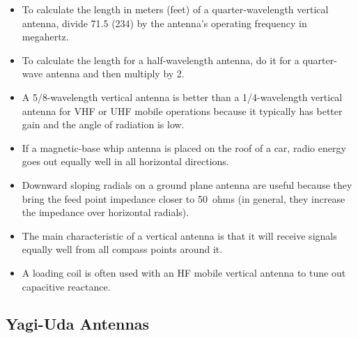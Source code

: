 \documentclass[letterpaper,12pt]{scrartcl}
\begin{document}
\begin{itemize}
\item To calculate the length in meters (feet) of a quarter-wavelength vertical antenna,
divide 71.5 (234) by the antenna's operating frequency in megahertz.
\item To calculate the length for a half-wavelength antenna, do it for a quarter-wave antenna and then multiply by 2.
\item A 5/8-wavelength vertical antenna is better than a 1/4-wavelength vertical antenna for VHF or UHF mobile operations
because it typically has better gain and the angle of radiation is low.
\item If a magnetic-base whip antenna is placed on the roof of a car, radio energy goes out equally well in all horizontal directions.
\item Downward sloping radials on a ground plane antenna are useful because they bring the feed point impedance closer to 50~ohms
(in general, they increase the impedance over horizontal radials).
\item The main characteristic of a vertical antenna is that it will receive signals equally well from all compass points around it.
\item A loading coil is often used with an HF mobile vertical antenna to tune out capacitive reactance.
\end{itemize}

\subsection{Yagi-Uda Antennas}
\end{document}
